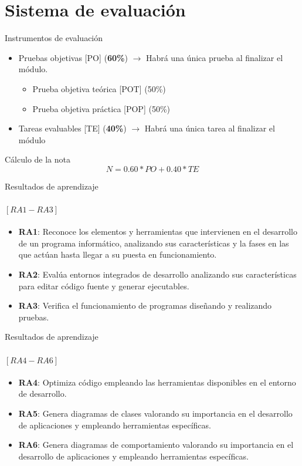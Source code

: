 \documentclass{beamer}
\begin{document}
\section{Sistema de evaluación}
\begin{frame}{Instrumentos de evaluación}
    \begin{itemize}
        \item Pruebas objetivas [PO] (\textbf{60\%}) $\rightarrow$ Habrá una única prueba al finalizar el módulo.
        \begin{itemize}
            \item Prueba objetiva teórica [POT] (50\%)
            \item Prueba objetiva práctica [POP] (50\%)
        \end{itemize}
        \item Tareas evaluables [TE] (\textbf{40\%}) $\rightarrow$ Habrá una única tarea al finalizar el módulo
    \end{itemize}

    \begin{block}{\tiny{Cálculo de la nota}}
        \vspace{-1em}
        \begin{equation*}
        N = 0.60 * PO + 0.40 * TE
        \end{equation*}
    \end{block}
\end{frame}

\begin{frame}{Resultados de aprendizaje}
    \framesubtitle{$[RA1-RA3]$}
    \begin{itemize}
        \item \textbf{RA1}: Reconoce los elementos y herramientas que intervienen en el desarrollo de un programa informático, analizando sus características y la fases en las que actúan hasta llegar a su puesta en funcionamiento.
        \item \textbf{RA2}: Evalúa entornos integrados de desarrollo analizando sus características para editar código fuente y generar ejecutables.
        \item \textbf{RA3}: Verifica el funcionamiento de programas diseñando y realizando pruebas.
    \end{itemize}
\end{frame}

\begin{frame}{Resultados de aprendizaje}
    \framesubtitle{$[RA4-RA6]$}
    \begin{itemize}
        \item \textbf{RA4}: Optimiza código empleando las herramientas disponibles en el entorno de desarrollo.
        \item \textbf{RA5}: Genera diagramas de clases valorando su importancia en el desarrollo de aplicaciones y empleando herramientas específicas.
        \item \textbf{RA6}: Genera diagramas de comportamiento valorando su importancia en el desarrollo de aplicaciones y empleando herramientas específicas.
    \end{itemize}
\end{frame}
\end{document}
